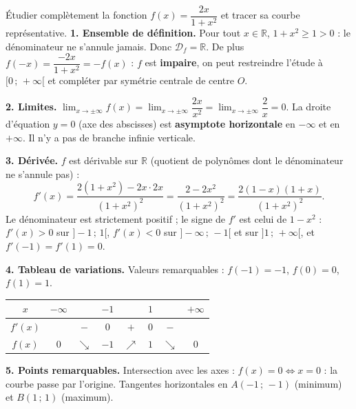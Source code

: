 \documentclass[11pt]{article}
\begin{document}
\begin{exoresolu}[Étude complète de $f(x)=\dfrac{2x}{1+x^2}$]
Étudier complètement la fonction $f(x)=\dfrac{2x}{1+x^2}$ et tracer sa courbe représentative.
\tcblower
\textbf{1. Ensemble de définition.} Pour tout $x\in\mathbb{R}$, $1+x^2\geq 1>0$ : le dénominateur ne s'annule jamais. Donc $\mathcal{D}_f=\mathbb{R}$. De plus $f(-x)=\dfrac{-2x}{1+x^2}=-f(x)$ : $f$ est \textbf{impaire}, on peut restreindre l'étude à $[0\,;\,+\infty[$ et compléter par symétrie centrale de centre $O$.

\textbf{2. Limites.} $\lim_{x\to\pm\infty}f(x)=\lim_{x\to\pm\infty}\dfrac{2x}{x^2}=\lim_{x\to\pm\infty}\dfrac{2}{x}=0$. La droite d'équation $y=0$ (axe des abscisses) est \textbf{asymptote horizontale} en $-\infty$ et en $+\infty$. Il n'y a pas de branche infinie verticale.

\textbf{3. Dérivée.} $f$ est dérivable sur $\mathbb{R}$ (quotient de polynômes dont le dénominateur ne s'annule pas) :
\[ f'(x)=\frac{2(1+x^2)-2x\cdot 2x}{(1+x^2)^2}=\frac{2-2x^2}{(1+x^2)^2}=\frac{2(1-x)(1+x)}{(1+x^2)^2}. \]
Le dénominateur est strictement positif ; le signe de $f'$ est celui de $1-x^2$ :
$f'(x)>0$ sur $]-1\,;\,1[$, $f'(x)<0$ sur $]-\infty\,;\,-1[$ et sur $]1\,;\,+\infty[$, et $f'(-1)=f'(1)=0$.

\textbf{4. Tableau de variations.} Valeurs remarquables : $f(-1)=-1$, $f(0)=0$, $f(1)=1$.
\begin{center}
\begin{tabular}{|c|ccccccc|}
\hline
$x$ & $-\infty$ & & $-1$ & & $1$ & & $+\infty$ \\
\hline
$f'(x)$ & & $-$ & $0$ & $+$ & $0$ & $-$ & \\
\hline
$f(x)$ & $0$ & $\searrow$ & $-1$ & $\nearrow$ & $1$ & $\searrow$ & $0$ \\
\hline
\end{tabular}
\end{center}

\textbf{5. Points remarquables.} Intersection avec les axes : $f(x)=0\iff x=0$ : la courbe passe par l'origine. Tangentes horizontales en $A(-1\,;\,-1)$ (minimum) et $B(1\,;\,1)$ (maximum).


\end{exoresolu}
\end{document}
